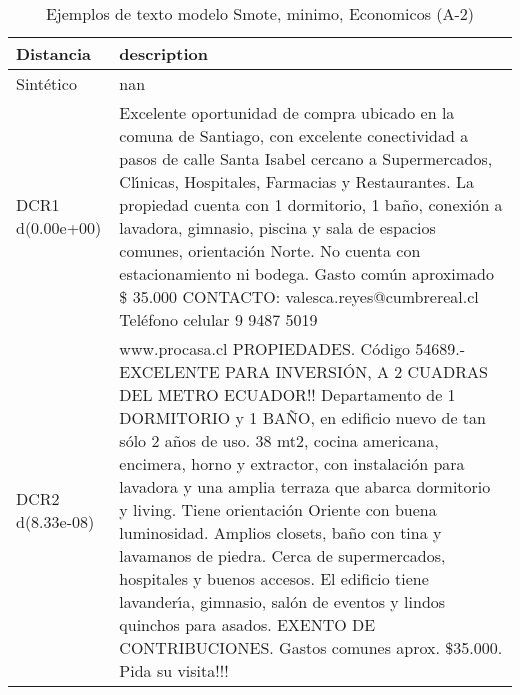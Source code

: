 \begin{table}[H]
\centering
\fontsize{10}{14}\selectfont
\caption{Ejemplos de texto modelo Smote, minimo, Economicos (A-2)}
\label{table-example-economicos-a-2-smote-enc-min-text}
\begin{tabular}{|l|m{35em}|}
\hline
\rowcolor[gray]{0.8}
Distancia & description \\
\hline Sintético & nan \\
\hline DCR1 d(0.00e+00) & Excelente oportunidad de compra ubicado en la comuna de Santiago, con excelente conectividad a pasos de calle Santa Isabel cercano a Supermercados, Cl{\'\i}nicas, Hospitales, Farmacias y Restaurantes. La propiedad cuenta con 1 dormitorio, 1 ba\~no, conexi\'on a lavadora, gimnasio, piscina y sala de espacios comunes, orientaci\'on Norte.
 No cuenta con estacionamiento ni bodega. Gasto com\'un aproximado \$ 35.000 CONTACTO: valesca.reyes@cumbrereal.cl Tel\'efono celular 9 9487 5019 \\
\hline DCR2 d(8.33e-08) & www.procasa.cl    PROPIEDADES. C\'odigo 54689.- EXCELENTE PARA INVERSI\'ON, A 2 CUADRAS DEL METRO ECUADOR!! Departamento de 1 DORMITORIO y 1 BA\~NO, en edificio nuevo de tan s\'olo 2 a\~nos de uso. 38 mt2, cocina americana, encimera, horno y extractor, con instalaci\'on para lavadora y una amplia terraza que abarca dormitorio y living. Tiene orientaci\'on Oriente con buena luminosidad. Amplios closets, ba\~no con tina y lavamanos de piedra. Cerca de supermercados, hospitales y buenos accesos. El edificio tiene lavander{\'\i}a, gimnasio, sal\'on de eventos y lindos quinchos para asados.   EXENTO DE CONTRIBUCIONES. Gastos comunes aprox. \$35.000.  Pida su visita!!! \\
\hline
\end{tabular}
\end{table}
